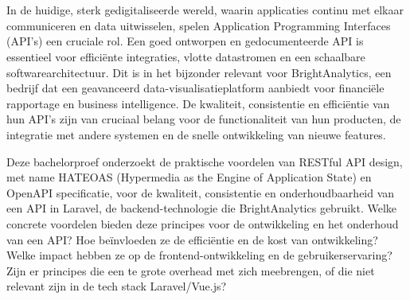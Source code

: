 
%
%
%
%
%


\chapter*{}
In de huidige, sterk gedigitaliseerde wereld, waarin applicaties continu met elkaar communiceren en data uitwisselen, spelen Application Programming Interfaces (API's) een cruciale rol. Een goed ontworpen en gedocumenteerde API is essentieel voor efficiënte integraties, vlotte datastromen en een schaalbare softwarearchitectuur. Dit is in het bijzonder relevant voor BrightAnalytics, een bedrijf dat een geavanceerd data-visualisatieplatform aanbiedt voor financiële rapportage en business intelligence. De kwaliteit, consistentie en efficiëntie van hun API's zijn van cruciaal belang voor de functionaliteit van hun producten, de integratie met andere systemen en de snelle ontwikkeling van nieuwe features.

\bigskip

Deze bachelorproef onderzoekt de praktische voordelen van RESTful API design, met name HATEOAS (Hypermedia as the Engine of Application State) en OpenAPI specificatie, voor de kwaliteit, consistentie en onderhoudbaarheid van een API in Laravel, de backend-technologie die BrightAnalytics gebruikt. Welke concrete voordelen bieden deze principes voor de ontwikkeling en het onderhoud van een API? Hoe beïnvloeden ze de efficiëntie en de kost van ontwikkeling? Welke
impact hebben ze op de frontend-ontwikkeling en de gebruikerservaring? Zijn er principes die een te grote overhead met zich meebrengen, of die niet relevant zijn in de tech stack Laravel/Vue.js?

